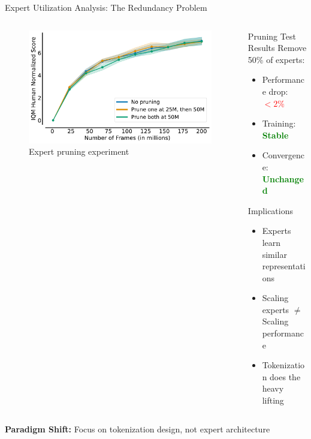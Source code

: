 \documentclass{beamer}
\begin{document}
\begin{frame}{Expert Utilization Analysis: The Redundancy Problem}
  \begin{columns}[T]
    \begin{column}{0.5\textwidth}
      \begin{figure}
        \centering
        \includegraphics[width=\textwidth]{Don_t_flatten_tokenize/figures/results/SoftMoE-4-ExpertsPruning.pdf}
        \caption{Expert pruning experiment}
      \end{figure}
    \end{column}
    \begin{column}{0.5\textwidth}
      \begin{block}{Pruning Test Results}
        \small
        Remove 50\% of experts:
        \begin{itemize}
          \item Performance drop: \textcolor{red}{\textbf{$< 2\%$}}
          \item Training: \textcolor{green}{\textbf{Stable}}
          \item Convergence: \textcolor{green}{\textbf{Unchanged}}
        \end{itemize}
      \end{block}
      
      \vspace{0.3em}
      \begin{block}{Implications}
        \small
        \begin{itemize}
          \item Experts learn similar representations
          \item Scaling experts $\neq$ Scaling performance
          \item Tokenization does the heavy lifting
        \end{itemize}
      \end{block}
    \end{column}
  \end{columns}
  
  \vspace{0.5em}
  \begin{center}
    \colorbox{yellow!30}{\parbox{0.9\textwidth}{\centering
    \textbf{Paradigm Shift:} Focus on tokenization design, not expert architecture}}
  \end{center}
\end{frame}
\end{document}
